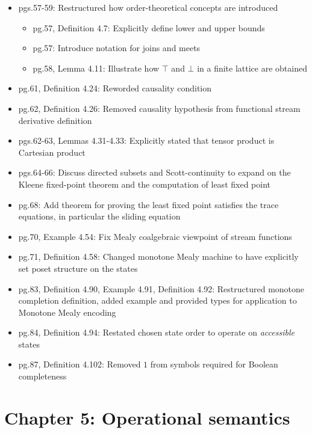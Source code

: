 \documentclass{article}
\begin{document}
\begin{itemize}
    \item pgs.57-59: Restructured how order-theoretical concepts are introduced
          \begin{itemize}
              \item pg.57, Definition 4.7: Explicitly define lower and upper
                    bounds
              \item pg.57: Introduce notation for joins and meets
              \item pg.58, Lemma 4.11: Illustrate how \(\top\) and \(\bot\) in a
                    finite lattice are obtained
          \end{itemize}
    \item pg.61, Definition 4.24: Reworded causality condition
    \item pg.62, Definition 4.26: Removed causality hypothesis from functional
          stream derivative definition
    \item pgs.62-63, Lemmas 4.31-4.33: Explicitly stated that tensor product is
          Cartesian product
    \item pgs.64-66: Discuss directed subsets and Scott-continuity to expand on
          the Kleene fixed-point theorem and the computation of least fixed point
    \item pg.68: Add theorem for proving the least fixed point satisfies the
          trace equations, in particular the sliding equation
    \item pg.70, Example 4.54: Fix Mealy coalgebraic viewpoint of stream functions
    \item pg.71, Definition 4.58: Changed monotone Mealy machine to have
          explicitly set poset structure on the states
    \item pg.83, Definition 4.90, Example 4.91, Definition 4.92: Restructured
          monotone completion definition, added example and provided types
          for application to Monotone Mealy encoding
    \item pg.84, Definition 4.94: Restated chosen state order to operate on
          \emph{accessible} states
    \item pg.87, Definition 4.102: Removed \(1\) from symbols required for
          Boolean completeness
\end{itemize}

\section*{Chapter 5: Operational semantics}
\end{document}
